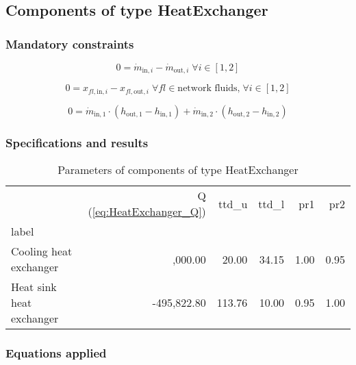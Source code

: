 \documentclass[]{article}
\newcommand{\bftab}{\fontseries{b}\selectfont}
\begin{document}
\subsection{Components of type HeatExchanger}

\subsubsection{Mandatory constraints}

\begin{equation}
\label{eq:HeatExchanger_mass_flow_constraints}
0=\dot{m}_{\mathrm{in,}i}-\dot{m}_{\mathrm{out,}i}\; \forall i \in [1, 2]
\end{equation}

\begin{equation}
\label{eq:HeatExchanger_fluid_constraints}
0=x_{fl\mathrm{,in,}i}-x_{fl\mathrm{,out,}i}\;\forall fl \in\text{network fluids,}\; \forall i \in [1, 2]
\end{equation}

\begin{equation}
\label{eq:HeatExchanger_energy_balance_constraints}
0 = \dot{m}_\mathrm{in,1} \cdot \left(h_\mathrm{out,1} - h_\mathrm{in,1} \right) +\dot{m}_\mathrm{in,2} \cdot \left(h_\mathrm{out,2} - h_\mathrm{in,2} \right)
\end{equation}


\subsubsection{Specifications and results}

\begin{table}[H]
\centering
\caption{Parameters of components of type HeatExchanger}
\begin{tabular}{lrrrrr}
\toprule
{} & Q (\ref{eq:HeatExchanger_Q}) &  ttd\_u & ttd\_l &   pr1 &   pr2 \\
label                    &                              &         &        &       &       \\
\midrule
Cooling heat exchanger   &           \bftab -100,000.00 &   20.00 &  34.15 &  1.00 &  0.95 \\
Heat sink heat exchanger &                  -495,822.80 &  113.76 &  10.00 &  0.95 &  1.00 \\
\bottomrule
\end{tabular}
\end{table}
\subsubsection{Equations applied}
\end{document}
